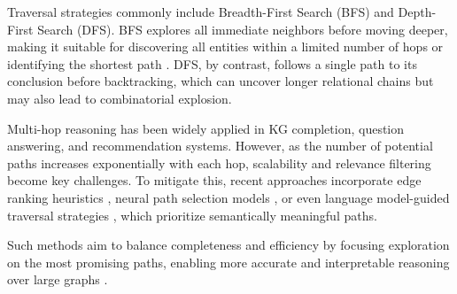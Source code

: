 Traversal strategies commonly include Breadth-First Search (BFS) and Depth-First Search (DFS). BFS explores all immediate neighbors before moving deeper, making it suitable for discovering all entities within a limited number of hops or identifying the shortest path \cite{lee2012pathrank}. DFS, by contrast, follows a single path to its conclusion before backtracking, which can uncover longer relational chains but may also lead to combinatorial explosion.

Multi-hop reasoning has been widely applied in KG completion, question answering, and recommendation systems. However, as the number of potential paths increases exponentially with each hop, scalability and relevance filtering become key challenges. To mitigate this, recent approaches incorporate edge ranking heuristics \cite{pandy2022learning}, neural path selection models \cite{yao2020kgbert}, or even language model-guided traversal strategies \cite{tan2025paths}, which prioritize semantically meaningful paths.

Such methods aim to balance completeness and efficiency by focusing exploration on the most promising paths, enabling more accurate and interpretable reasoning over large graphs \cite{xu2021fusing}.





